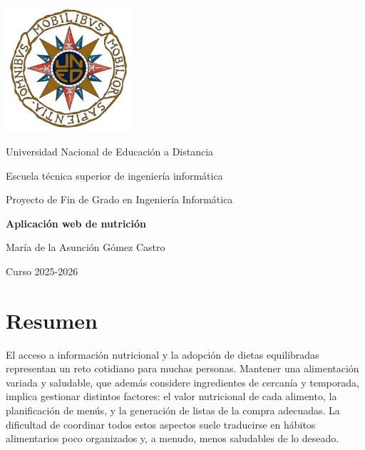 \documentclass{article}
\begin{document}
\hypersetup{pageanchor=false}

\begin{titlepage}
\centering
\includegraphics[width=0.35\textwidth]{logo-uned.jpeg}

\vspace{1.5cm}

{\Large Universidad Nacional de Educación a Distancia\par}
\vspace{0.4cm}
{\large Escuela técnica superior de ingeniería informática\par}

\vspace{1.6cm}

{\large Proyecto de Fin de Grado en Ingeniería Informática\par}

\vspace{1.6cm}

{\LARGE \textbf{Aplicación web de nutrición}\par}

\vspace{2.2cm}

{\large María de la Asunción Gómez Castro\par}

\vfill

{\large Curso 2025-2026\par}
\end{titlepage}
\clearpage
{}
\setcounter{page}{1}
\hypersetup{pageanchor=true}

\section*{Resumen}
El acceso a información nutricional y la adopción de dietas equilibradas representan un reto cotidiano para muchas personas. Mantener una alimentación variada y saludable, que además considere ingredientes de cercanía y temporada, implica gestionar distintos factores: el valor nutricional de cada alimento, la planificación de menús, y la generación de listas de la compra adecuadas. La dificultad de coordinar todos estos aspectos suele traducirse en hábitos alimentarios poco organizados y, a menudo, menos saludables de lo deseado.
\end{document}
